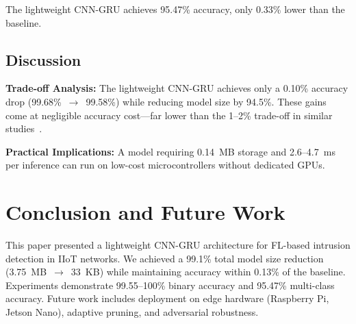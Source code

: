 \documentclass[preprint,12pt]{elsarticle}
\begin{document}
The lightweight CNN-GRU achieves 95.47\% accuracy, only 0.33\% lower than the baseline.

\subsection{Discussion}

\textbf{Trade-off Analysis:} The lightweight CNN-GRU achieves only a 0.10\% accuracy drop (99.68\%~$\rightarrow$~99.58\%) while reducing model size by 94.5\%. These gains come at negligible accuracy cost---far lower than the 1--2\% trade-off in similar studies~\cite{anwer2025advanced,pecherle2026federated}.

\textbf{Practical Implications:} A model requiring 0.14~MB storage and 2.6--4.7~ms per inference can run on low-cost microcontrollers without dedicated GPUs.

\section{Conclusion and Future Work}
\label{sec:conclusion}

This paper presented a lightweight CNN-GRU architecture for FL-based intrusion detection in IIoT networks. We achieved a 99.1\% total model size reduction (3.75~MB~$\rightarrow$~33~KB) while maintaining accuracy within 0.13\% of the baseline. Experiments demonstrate 99.55--100\% binary accuracy and 95.47\% multi-class accuracy. Future work includes deployment on edge hardware (Raspberry Pi, Jetson Nano), adaptive pruning, and adversarial robustness.
\end{document}
